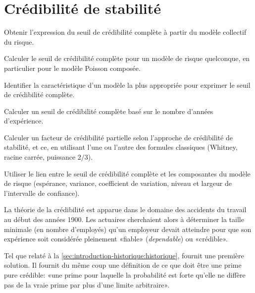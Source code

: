 
\chapter{Crédibilité de stabilité}
\label{chap:stabilite}

\begin{objectifs}
\item Obtenir l'expression du seuil de crédibilité complète à partir
  du modèle collectif du risque.
\item Calculer le seuil de crédibilité complète pour un modèle de
  risque quelconque, en particulier pour le modèle Poisson composée.
\item Identifier la caractéristique d'un modèle la plus appropriée
  pour exprimer le seuil de crédibilité complète.
\item Calculer un seuil de crédibilité complète basé sur le nombre
  d'années d'expérience.
\item Calculer un facteur de crédibilité partielle selon l'approche de
  crédibilité de stabilité, et ce, en utilisant l'une ou l'autre des
  formules classiques (Whitney, racine carrée, puissance $2/3$).
\item Utiliser le lien entre le seuil de crédibilité complète et les
  composantes du modèle de risque (espérance, variance, coefficient de
  variation, niveau et largeur de l'intervalle de confiance).
\end{objectifs}

La théorie de la crédibilité est apparue dans le domaine des accidents
du travail au début des années 1900. Les actuaires cherchaient alors à
déterminer la taille minimale (en nombre d'employés) qu'un employeur
devait atteindre pour que son expérience soit considérée pleinement
«fiable» (\emph{dependable}) ou «crédible».

Tel que relaté à la \autoref{sec:introduction-historique:historique},
\cite{Mowbray:1914} fournit une première solution. Il fournit du même
coup une définition de ce que doit être une prime pure crédible: «une
prime pour laquelle la probabilité est forte qu'elle ne diffère pas de
la vraie prime par plus d'une limite arbitraire».

